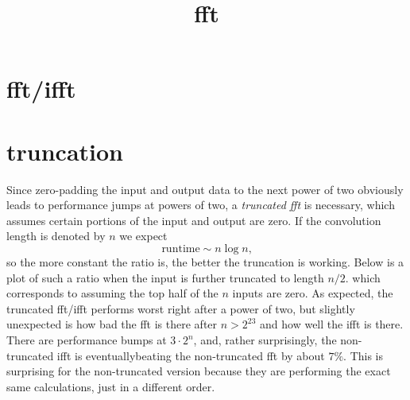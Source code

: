 \documentclass[12 pt]{amsart}
\begin{document}
\title{fft}

\section{fft/ifft}


\section{truncation}

Since zero-padding the input and output data to the next power of two obviously leads to performance jumps at powers of two, a \emph{truncated fft} is necessary, which assumes certain portions of the input and output are zero. If the convolution length is denoted by $n$ we expect
\begin{equation*}
\text{runtime} \sim n \log n\text{,}
\end{equation*}
so the more constant the ratio is, the better the truncation is working. Below is a plot of such a ratio when the input is further truncated to length $n/2$. which corresponds to assuming the top half of the $n$ inputs are zero. As expected, the truncated fft/ifft performs worst right after a power of two, but slightly unexpected is how bad the fft is there after $n>2^{23}$ and how well the ifft is there. There are performance bumps at $3 \cdot 2^n$, and, rather surprisingly, the non-truncated ifft is eventuallybeating the non-truncated fft by about $7\%$. This is surprising for the non-truncated version because they are performing the exact same calculations, just in a different order.
\end{document}
